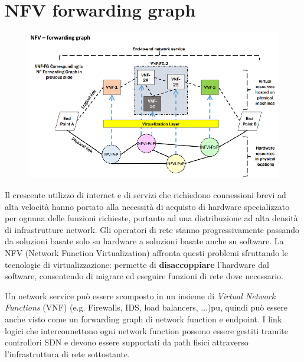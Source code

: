 \section{NFV forwarding graph}

\begin{figure}[htbp]
   \centering
   \includegraphics{images/questions/Schermata del 2023-11-02 17-23-22.png}
   \label{fig:dom2.12}
\end{figure}

Il crescente utilizzo di internet e di servizi che richiedono connessioni brevi ad alta velocità hanno portato alla necessità di acquisto di hardware specializzato per ognuna delle funzioni richieste, portanto ad una distribuzione ad alta densità di infrastrutture network. Gli operatori di rete stanno progressivamente passando da soluzioni basate solo su hardware a soluzioni basate anche su software. La NFV (Network Function Virtualization) affronta questi problemi sfruttando le tecnologie di virtualizzazione: permette di \textbf{disaccoppiare} l'hardware dal software, consentendo di migrare ed eseguire funzioni di rete dove necessario. 

Un network service può essere scomposto in un insieme di \textit{Virtual Network Functions} (VNF) (e.g. Firewalls, IDS, load balancers, ...)pu, quindi può essere anche visto come un forwarding graph di network function e endpoint. I link logici che interconnettono ogni network function possono essere gestiti tramite controllori SDN e devono essere supportati da path fisici attraverso l'infrastruttura di rete sottostante.


